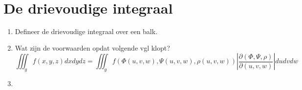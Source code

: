 \documentclass[12pt]{article}
\begin{document}
    \maketitle

    \section{De drievoudige integraal}
    \begin{enumerate}
        \item Defineer de drievoudige integraal over een balk.
        \item Wat zijn de voorwaarden opdat volgende vgl klopt?
        $$\iiint_g f(x,y,z)dxdydz = \iiint_g f(\Phi (u,v,w), \Psi (u,v,w), \rho (u,v,w)) \left|\frac{\partial(\Phi, \Psi, \rho)}{\partial(u,v,w)}\right| dudvdw$$
        \item 
    \end{enumerate}
\end{document}
